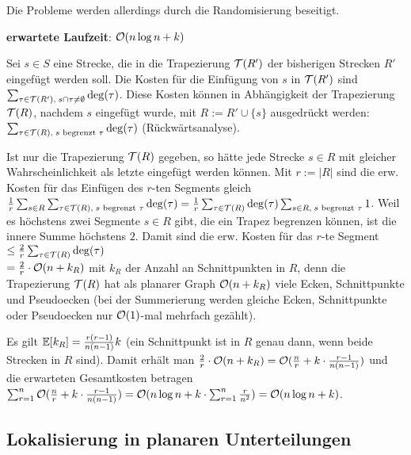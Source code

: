 Die Probleme werden allerdings durch die Randomisierung beseitigt.

\linie
\pagebreak

\textbf{erwartete Laufzeit}:
$\mathcal{O}(n \log n + k)$

\begin{Beweis}
    Sei $s \in S$ eine Strecke, die in die Trapezierung $\mathcal{T}(R')$ der bisherigen Strecken
    $R'$ eingefügt werden soll.
    Die Kosten für die Einfügung von $s$ in $\mathcal{T}(R')$ sind
    $\sum_{\tau \in \mathcal{T}(R'),\; s \cap \tau \not= \emptyset} \deg(\tau)$.
    Diese Kosten können in Abhängigkeit der Trapezierung $\mathcal{T}(R)$, nachdem $s$ eingefügt wurde,
    mit $R := R' \cup \{s\}$ ausgedrückt werden:
    $\sum_{\tau \in \mathcal{T}(R),\; s \text{ begrenzt } \tau} \deg(\tau)$
    (Rückwärtsanalyse).
    
    Ist nur die Trapezierung $\mathcal{T}(R)$ gegeben, so hätte jede Strecke $s \in R$ mit gleicher
    Wahrscheinlichkeit als letzte eingefügt werden können.
    Mit $r := |R|$ sind die erw. Kosten für das Einfügen des $r$-ten Segments gleich
    $\frac{1}{r} \sum_{s \in R} \sum_{\tau \in \mathcal{T}(R),\; s \text{ begrenzt } \tau} \deg(\tau)
    = \frac{1}{r} \sum_{\tau \in \mathcal{T}(R)} \deg(\tau) \sum_{s \in R,\; s \text{ begrenzt } \tau} 1$.
    Weil es höchstens zwei Segmente $s \in R$ gibt, die ein Trapez begrenzen können, ist
    die innere Summe höchstens $2$.
    Damit sind die erw. Kosten für das $r$-te Segment
    $\le \frac{2}{r} \sum_{\tau \in \mathcal{T}(R)} \deg(\tau)$\\
    $= \frac{2}{r} \cdot \mathcal{O}(n + k_R)$ mit $k_R$ der Anzahl an Schnittpunkten in $R$,
    denn die Trapezierung $\mathcal{T}(R)$ hat als planarer Graph $\mathcal{O}(n + k_R)$ viele Ecken, Schnittpunkte
    und Pseudoecken
    (bei der Summerierung werden gleiche Ecken, Schnittpunkte oder Pseudoecken nur $\mathcal{O}(1)$-mal
    mehrfach gezählt).
    
    Es gilt $\mathbb{E}[k_R] = \frac{r(r-1)}{n(n-1)} k$
    (ein Schnittpunkt ist in $R$ genau dann, wenn beide Strecken in $R$ sind).
    Damit erhält man $\frac{2}{r} \cdot \mathcal{O}(n + k_R)
    = \mathcal{O}(\frac{n}{r} + k \cdot \frac{r - 1}{n(n-1)})$
    und die erwarteten Gesamtkosten betragen
    $\sum_{r=1}^n \mathcal{O}(\frac{n}{r} + k \cdot \frac{r - 1}{n(n-1)})
    = \mathcal{O}(n \log n + k \cdot \sum_{r=1}^n \frac{r}{n^2}) = \mathcal{O}(n \log n + k)$.
\end{Beweis}

\subsection{%
    Lokalisierung in planaren Unterteilungen%
}

